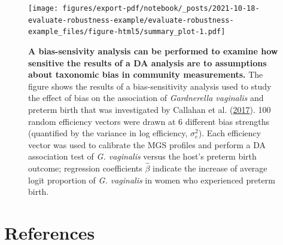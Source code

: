 \documentclass[
]{article}
\begin{document}
\begin{figure}
\centering
\texttt{[image: figures/export-pdf/notebook/\_posts/2021-10-18-evaluate-robustness-example/evaluate-robustness-example\_files/figure-html5/summary\_plot-1.pdf]}
\caption{\label{fig:sensitivity-example}\textbf{A bias-sensivity analysis can be performed to examine how sensitive the results of a DA analysis are to assumptions about taxonomic bias in community measurements.} The figure shows the results of a bias-sensitivity analysis used to study the effect of bias on the association of \emph{Gardnerella vaginalis} and preterm birth that was investigated by Callahan et al. (\protect\hyperlink{ref-callahan2017repl}{2017}). 100 random efficiency vectors were drawn at 6 different bias strengths (quantified by the variance in log efficiency, \(\sigma_{e}^{2}\)). Each efficiency vector was used to calibrate the MGS profiles and perform a DA association test of \emph{G. vaginalis} versus the host's preterm birth outcome; regression coefficients \(\hat \beta\) indicate the increase of average logit proportion of \emph{G. vaginalis} in women who experienced preterm birth.}
\end{figure}



\hypertarget{references}{%
\section*{References}\label{references}}
\end{document}
